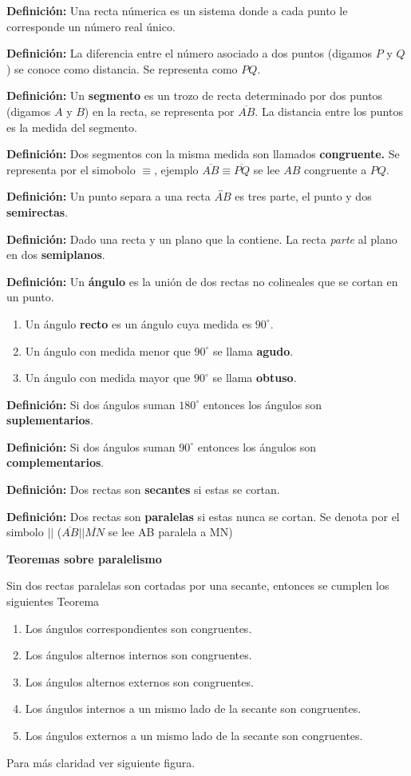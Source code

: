 \textbf{Definición:} Una recta númerica es un sistema donde a cada punto le corresponde un número real único.

\textbf{Definición:} La diferencia entre el número asociado a dos puntos (digamos $P$ y $Q$) se conoce como distancia.
Se representa como $PQ$.

\textbf{Definición:} Un \textbf{segmento} es un trozo de recta determinado por dos puntos (digamos $A$ y $B$) en la recta, se representa por $\overline{AB}$.
La distancia entre los puntos es la medida del segmento.

\textbf{Definición:} Dos segmentos con la misma medida son llamados \textbf{congruente.}
Se representa por el simobolo $\equiv$, ejemplo $\overline{AB} \equiv \overline{PQ}$ se lee $AB$ congruente a $PQ$.

\textbf{Definición:} Un punto separa a una recta $\overleftrightarrow{AB}$ es tres parte, el punto y dos \textbf{semirectas}.

\textbf{Definición:} Dado una recta y un plano que la contiene.
La recta \textit{parte} al plano en dos \textbf{semiplanos}.


\textbf{Definición:} Un \textbf{ángulo} es la unión de dos rectas no colineales que se cortan en un punto.

\begin{enumerate}
    \item Un ángulo \textbf{recto} es un ángulo cuya medida es $90^\circ$.
    \item Un ángulo con medida menor que $90^\circ$ se llama \textbf{agudo}.
    \item Un ángulo con medida mayor que $90^\circ$ se llama \textbf{obtuso}.
\end{enumerate}

\textbf{Definición:} Si dos ángulos suman $180^{\circ}$ entonces los ángulos son \textbf{suplementarios}.


\textbf{Definición:} Si dos ángulos suman $90^{\circ}$ entonces los ángulos son \textbf{complementarios}.


\textbf{Definición:} Dos rectas son \textbf{secantes} si estas se cortan.


\textbf{Definición:} Dos rectas son \textbf{paralelas} si estas nunca se cortan. Se denota por el simbolo $||$ ($\overline{AB} || \overline{MN}$ se lee AB paralela a MN)


\textbf{Teoremas sobre paralelismo}

Sin dos rectas paralelas son cortadas por una secante, entonces se cumplen los siguientes Teorema
\begin{enumerate}
    \item Los ángulos correspondientes son congruentes.
    \item Los ángulos alternos internos son congruentes.
    \item Los ángulos alternos externos son congruentes.
    \item Los ángulos internos a un mismo lado de la secante son congruentes.
    \item Los ángulos externos a un mismo lado de la secante son congruentes.
\end{enumerate}
Para más claridad ver siguiente figura.

